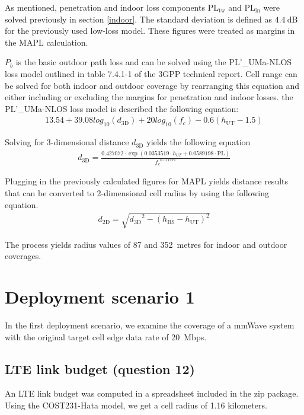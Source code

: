 \documentclass{article}
\begin{document}
As mentioned, penetration and indoor loss components \(\mathrm{PL_{tw}}\) and \(\mathrm{PL_{in}}\) were solved previously in section \ref{indoor}. The standard deviation is defined as \(\SI{4.4}{\deci\bel}\) for the previously used low-loss model. These figures were treated as margins in the MAPL calculation.

\(P_b\) is the basic outdoor path loss and can be solved using the PL’\_UMa-NLOS loss model outlined in table 7.4.1-1 of the 3GPP technical report. Cell range can be solved for both indoor and outdoor coverage by rearranging this equation and either including or excluding the margins for penetration and indoor losses. the PL’\_UMa-NLOS loss model is described the following equation:
\begin{gather*}
    13.54 + 39.08 log_{10}(d_{\mathrm{3D}}) + 20 log_{10}(f_c)
    -0.6(h_{\mathrm{UT}}-1.5)
\end{gather*}

Solving for 3-dimensional distance \(d_{\mathrm{3D}}\) yields the following equation
\begin{gather*}
    d_{\mathrm{3D}} = \frac{0.427072 \cdot \exp(0.0353519 \cdot h_{UT} + 0.0589198 \cdot \mathrm{PL})}{{f_c}^{0.511771}}
\end{gather*}

Plugging in the previously calculated figures for MAPL yields distance results that can be converted to 2-dimensional cell radius by using the following equation.
\begin{gather*}
    d_{\mathrm{2D}} = \sqrt{{d_{\mathrm{3D}}}^2 - (h_{\mathrm{BS}} - h_{\mathrm{UT}})^2}
\end{gather*}

The process yields radius values of 87 and 352\ metres for indoor and outdoor coverages.

\section{Deployment scenario 1}
In the first deployment scenario, we examine the coverage of a mmWave system with the original target cell edge data rate of 20\ Mbps.

\subsection{LTE link budget (question 12)}
An LTE link budget was computed in a spreadsheet included in the zip package. Using the COST231-Hata model, we get a cell radius of 1.16 kilometers.
\end{document}
